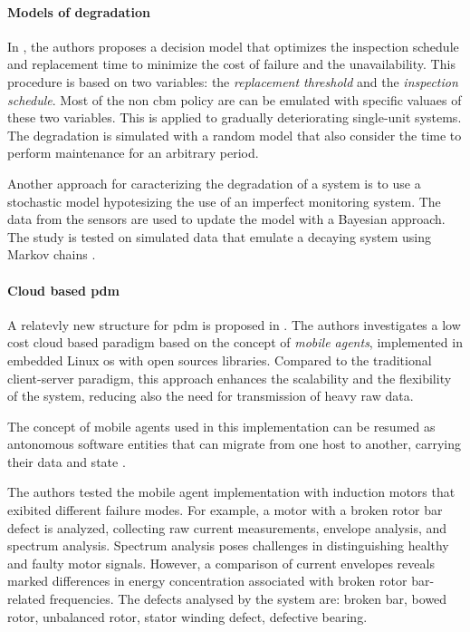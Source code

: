 \paragraph{Models of degradation}
In \cite{Pred_Maint_Tech_Grall}, the authors proposes a decision model that optimizes the inspection schedule and replacement time to minimize the cost of failure and the unavailability. This procedure is based on two variables: the \emph{replacement threshold} and the \emph{inspection schedule}. Most of the non \gls{cbm} policy are can be emulated with specific valuaes of these two variables. This is applied to gradually deteriorating single-unit systems. The degradation is simulated with a random model that also consider the time to perform maintenance for an arbitrary period.

Another approach for caracterizing the degradation of a system is to use a stochastic model hypotesizing the use of an imperfect monitoring system. The data from the sensors are used to update the model with a Bayesian approach. The study is tested on simulated data that emulate a decaying system using Markov chains \cite{CURCURU2010989}\cite{GALANTE19981361}\cite{State_Art_Coanda_2020}.

\paragraph{Cloud based \gls{pdm}}
A relatevly new structure for \gls{pdm} is proposed in \cite{CloudBased_Wang}. The authors investigates a low cost cloud based paradigm based on the concept of \emph{mobile agents}, implemented in embedded Linux \gls{os} with open sources libraries. Compared to the traditional client-server paradigm, this approach enhances the scalability and the flexibility of the system, reducing also the need for transmission of heavy raw data.

The concept of mobile agents used in this implementation can be resumed as antonomous software entities that can migrate from one host to another, carrying their data and state \cite{CUCURULL2009712}.

The authors \cite{CloudBased_Wang} tested the mobile agent implementation with induction motors that exibited different failure modes. For example, a motor with a broken rotor bar defect is analyzed, collecting raw current measurements, envelope analysis, and spectrum analysis. Spectrum analysis poses challenges in distinguishing healthy and faulty motor signals. However, a comparison of current envelopes reveals marked differences in energy concentration associated with broken rotor bar-related frequencies. The defects analysed by the system are: broken bar, bowed rotor, unbalanced rotor, stator winding defect, defective bearing.


